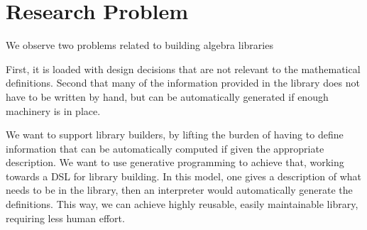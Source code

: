 
\section{Research Problem}

We observe two problems related to building algebra libraries

First, it is loaded with design decisions that are not relevant to the mathematical definitions. Second that many of the information provided in the library does not have to be written by hand, but can be automatically generated if enough machinery is in place. 


We want to support library builders, by lifting the burden of having to define information that can be automatically computed if given the appropriate description. We want to use generative programming to achieve that, working towards a DSL for library building. In this model, one gives a description of what needs to be in the library, then an interpreter would automatically generate the definitions. This way, we can achieve highly reusable, easily maintainable library, requiring less human effort. 

